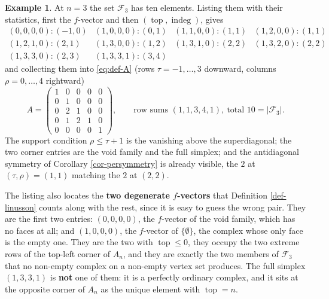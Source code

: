 \documentclass[11pt, a4paper, abstract=yes]{scrartcl}
\theoremstyle{definition}
\newtheorem{mexample}[definition]{Example}
\theoremstyle{remark}
\theoremstyle{plain}
\newcommand{\indeg}{\operatorname{indeg}}
\newcommand{\tp}{\operatorname{top}}
\begin{document}
\begin{mexample}
At \(n=3\) the set \(\mathcal F_3\) has ten elements. Listing them with their statistics, first the
\(f\)-vector and then \((\tp,\indeg)\), gives
\[
\begin{array}{llll}
 (0,0,0,0)\colon(-1,0) & (1,0,0,0)\colon(0,1) & (1,1,0,0)\colon(1,1) & (1,2,0,0)\colon(1,1)\\
 (1,2,1,0)\colon(2,1)  & (1,3,0,0)\colon(1,2) & (1,3,1,0)\colon(2,2) & (1,3,2,0)\colon(2,2)\\
 (1,3,3,0)\colon(2,3)  & (1,3,3,1)\colon(3,4) & &
\end{array}
\]
and collecting them into \eqref{eq:def-A} (rows \(\tau=-1,\dots,3\) downward, columns
\(\rho=0,\dots,4\) rightward)
\[
  A=\begin{pmatrix}
    1&0&0&0&0\\ 0&1&0&0&0\\ 0&2&1&0&0\\ 0&1&2&1&0\\ 0&0&0&0&1
  \end{pmatrix},
  \qquad \text{row sums } (1,1,3,4,1),\ \text{total }10=\lvert\mathcal F_3\rvert .
\]
The support condition \(\rho\le\tau+1\) is the vanishing above the superdiagonal; the two corner
entries are the void family and the full simplex; and the antidiagonal symmetry of
Corollary \ref{cor-persymmetry} is already visible, the \(2\) at \((\tau,\rho)=(1,1)\) matching the
\(2\) at \((2,2)\).

The listing also locates the \textbf{two degenerate \(f\)-vectors} that Definition \ref{def-linusson} counts
along with the rest, since it is easy to guess the wrong pair. They are the first two entries:
\((0,0,0,0)\), the \(f\)-vector of the void family, which has no faces at all; and \((1,0,0,0)\), the
\(f\)-vector of \(\lbrace\emptyset\rbrace\), the complex whose only face is the empty one. They are
the two with \(\tp\le0\), they occupy the two extreme rows of the top-left corner of \(A_n\), and they
are exactly the two members of \(\mathcal F_3\) that no non-empty complex on a non-empty vertex set
produces. The full simplex \((1,3,3,1)\) is \textbf{not} one of them: it is a perfectly ordinary complex, and
it sits at the opposite corner of \(A_n\) as the unique element with \(\tp=n\).
\label{ex-A}
\end{mexample}
\end{document}
